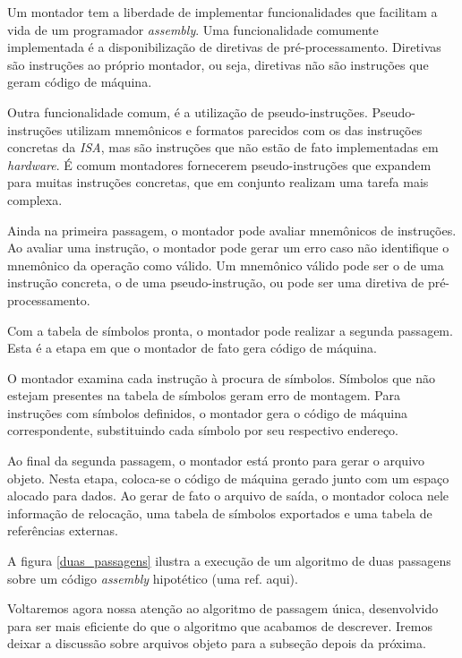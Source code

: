 Um montador tem a liberdade de implementar funcionalidades que facilitam a vida
de um programador \textit{assembly}. Uma funcionalidade comumente implementada é
a disponibilização de diretivas de pré-processamento. Diretivas são instruções
ao próprio montador, ou seja, diretivas não são instruções que geram código de
máquina.

Outra funcionalidade comum, é a utilização de
pseudo-instruções. Pseudo-instruções utilizam mnemônicos e formatos parecidos
com os das instruções concretas da \textit{ISA}, mas são instruções que não
estão de fato implementadas em \textit{hardware}. É comum montadores fornecerem
pseudo-instruções que expandem para muitas instruções concretas, que em conjunto
realizam uma tarefa mais complexa.

Ainda na primeira passagem, o montador pode avaliar mnemônicos de instruções. Ao
avaliar uma instrução, o montador pode gerar um erro caso não identifique o
mnemônico da operação como válido. Um mnemônico válido pode ser o de uma
instrução concreta, o de uma pseudo-instrução, ou pode ser uma diretiva de
pré-processamento.

Com a tabela de símbolos pronta, o montador pode realizar a segunda
passagem. Esta é a etapa em que o montador de fato gera código de máquina.

O montador examina cada instrução à procura de símbolos. Símbolos que não
estejam presentes na tabela de símbolos geram erro de montagem. Para instruções
com símbolos definidos, o montador gera o código de máquina correspondente,
substituindo cada símbolo por seu respectivo endereço.

Ao final da segunda passagem, o montador está pronto para gerar o arquivo
objeto. Nesta etapa, coloca-se o código de máquina gerado junto com um espaço
alocado para dados. Ao gerar de fato o arquivo de saída, o montador coloca nele
informação de relocação, uma tabela de símbolos exportados e uma tabela de
referências externas.

A figura \ref{duas_passagens} ilustra a execução de um algoritmo de duas
passagens sobre um código \textit{assembly} hipotético (uma ref. aqui).

Voltaremos agora nossa atenção ao algoritmo de passagem única, desenvolvido para
ser mais eficiente do que o algoritmo que acabamos de descrever. Iremos deixar a
discussão sobre arquivos objeto para a subseção depois da próxima.

